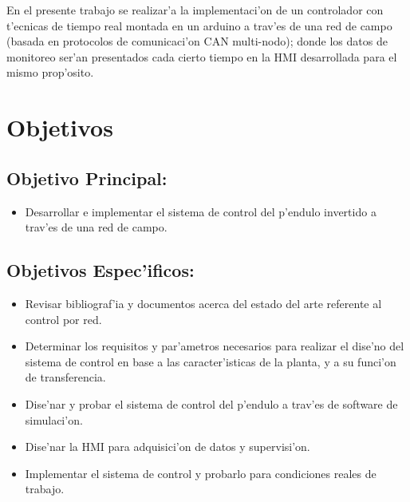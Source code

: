 En el presente trabajo se realizar'a la implementaci'on de un controlador con t'ecnicas de tiempo real montada en un arduino a trav'es de una red de campo (basada en protocolos de comunicaci'on CAN multi-nodo); donde los datos de monitoreo ser'an presentados cada cierto tiempo en la HMI desarrollada para el mismo prop'osito.


\section{Objetivos}

\subsection{Objetivo Principal:}
			\begin{itemize}
			\item Desarrollar e implementar el sistema de control del p'endulo invertido a trav'es de una red de campo.\\
			\end{itemize}
				 
\subsection{Objetivos Espec'ificos:}
			\begin{itemize}
			\item Revisar bibliograf'ia y documentos acerca del estado del arte referente al control por red.
			\item	Determinar los requisitos y par'ametros necesarios para realizar el dise'no del sistema de control en base a las caracter'isticas de la planta, y a su funci'on de transferencia.
			\item	Dise'nar y probar  el sistema de control del p'endulo a trav'es de software de simulaci'on. 
			\item	Dise'nar la HMI para adquisici'on de datos y supervisi'on.
			\item	Implementar el sistema de control y probarlo para condiciones reales de trabajo.
			\end{itemize} 

